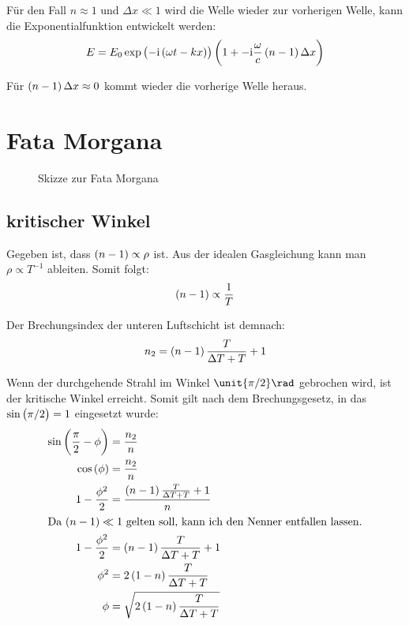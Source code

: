 \documentclass[11pt, ngerman, fleqn]{article}
\newcommand{\ii}{\mathrm i}
\begin{document}
Für den Fall $n \approx 1$ und $\Delta x \ll 1$ wird die Welle wieder zur
vorherigen Welle, kann die Exponentialfunktion entwickelt werden:
\[
	E = E_0 \exp\del{-\ii \del{\omega t - kx}}\del{1+- \ii \frac\omega c \del{n - 1} \Delta x}
\]

Für $\del{n-1}\Delta x \approx 0$ kommt wieder die vorherige Welle heraus.


\section{Fata Morgana}

\begin{figure}
	\centering
	\caption{Skizze zur Fata Morgana}
\end{figure}

\subsection{kritischer Winkel}

Gegeben ist, dass $\del{n-1} \propto \rho$ ist. Aus der idealen Gasgleichung
kann man $\rho \propto T^{-1}$ ableiten. Somit folgt:
\[
	\del{n-1} \propto \frac 1T
\]

Der Brechungsindex der unteren Luftschicht ist demnach:
\[
	n_2 = \del{n-1} \frac{T}{\Delta T + T} + 1
\]

Wenn der durchgehende Strahl im Winkel $\unit{\pi / 2}\rad$ gebrochen wird, ist
der kritische Winkel erreicht. Somit gilt nach dem Brechungsgesetz, in das
$\sin\del{\pi/2} = 1$ eingesetzt wurde:
\begin{align*}
	\sin\del{\frac \pi 2 - \phi} &= \frac{n_2}{n} \\
	\cos\del{\phi} &= \frac{n_2}{n} \\
	1-\frac{\phi^2}2 &= \frac{\del{n-1}\frac{T}{\Delta T + T}+1}{n} \\
	\intertext{Da $\del{n-1} \ll 1$ gelten soll, kann ich den Nenner entfallen lassen.}
	1-\frac{\phi^2}2 &= \del{n-1}\frac{T}{\Delta T + T}+1 \\
	\phi^2 &= 2\del{1-n}\frac{T}{\Delta T + T} \\
	  \phi &= \sqrt{2\del{1-n}\frac{T}{\Delta T + T}}
\end{align*}
\end{document}
